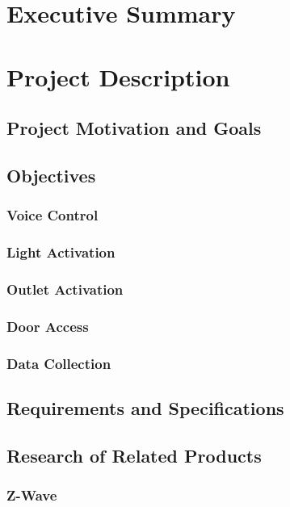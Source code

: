 \section{Executive Summary}
\lipsum[1]
\section{Project Description}
\lipsum[1]
 \subsection{Project Motivation and Goals}
\lipsum[1]
 \subsection{Objectives}
\lipsum[1]
  \subsubsection{Voice Control}
\lipsum[1]
  \subsubsection{Light Activation}
\lipsum[1]
  \subsubsection{Outlet Activation}
\lipsum[1]
  \subsubsection{Door Access}
\lipsum[1]
  \subsubsection{Data Collection}
\lipsum[1]
 \subsection{Requirements and Specifications}
\lipsum[1]
 \subsection{Research of Related Products}
\lipsum[1]
  \subsubsection{Z-Wave}
\lipsum[1]
